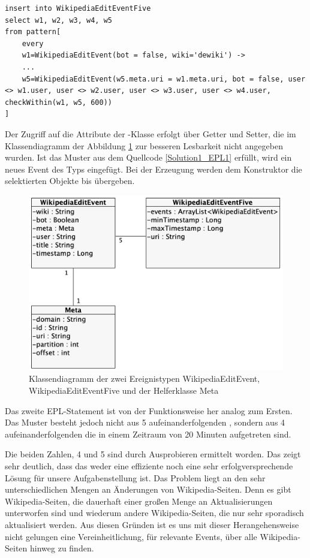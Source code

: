\begin{lstlisting}[label=Solution1_EPL1,caption=Lösung 1: EPL-Statement,language=epl,firstnumber=1,captionpos=b]
insert into WikipediaEditEventFive
select w1, w2, w3, w4, w5
from pattern[
    every
    w1=WikipediaEditEvent(bot = false, wiki='dewiki') ->
    ...
    w5=WikipediaEditEvent(w5.meta.uri = w1.meta.uri, bot = false, user <> w1.user, user <> w2.user, user <> w3.user, user <> w4.user, checkWithin(w1, w5, 600))
]
\end{lstlisting}

Der Zugriff auf die Attribute der -Klasse erfolgt über Getter und Setter, die im Klassendiagramm
der Abbildung \ref{fig:class_diagram_eventtypes} zur besseren Lesbarkeit nicht angegeben wurden.
Ist das Muster aus dem Quellcode \ref{Solution1_EPL1} erfüllt, wird ein neues Event des Typs 
eingefügt. Bei der Erzeugung werden dem Konstruktor die selektierten Objekte  bis  übergeben.

\begin{figure}[h]
    \includegraphics[width=.5\textwidth]{images/Esper1.png}
    \caption{Klassendiagramm der zwei Ereignistypen WikipediaEditEvent, WikipediaEditEventFive und der Helferklasse Meta}
    \label{fig:class_diagram_eventtypes}
\end{figure}

Das zweite EPL-Statement ist von der Funktionsweise her analog zum Ersten. Das Muster besteht jedoch nicht aus
5 aufeinanderfolgenden , sondern aus
4 aufeinanderfolgenden  die in einem Zeitraum von 20 Minuten aufgetreten sind.

Die beiden Zahlen, 4 und 5 sind durch Ausprobieren ermittelt worden. Das zeigt sehr deutlich, dass das weder eine
effiziente noch eine sehr erfolgversprechende Lösung für unsere Aufgabenstellung ist.
Das Problem liegt an den sehr unterschiedlichen Mengen an Änderungen von Wikipedia-Seiten.
Denn es gibt Wikipedia-Seiten, die dauerhaft einer großen Menge an Aktualisierungen unterworfen sind und wiederum andere Wikipedia-Seiten, die
nur sehr sporadisch aktualisiert werden. Aus diesen Gründen ist es uns mit dieser Herangehensweise
nicht gelungen eine Vereinheitlichung, für relevante Events, über alle Wikipedia-Seiten hinweg zu finden.

